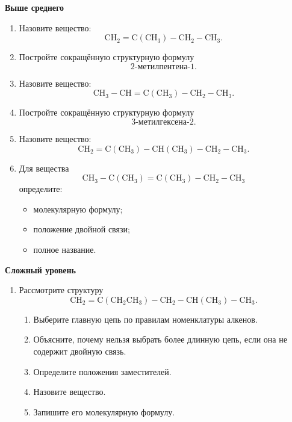 \documentclass[a4paper,12pt]{article}
\newcommand{\sublesson}[1]{%
    \vspace{0.4em}
    {\large\bfseries\color{accent}#1}\par
}
\begin{document}
\sublesson{Выше среднего}

\begin{enumerate}[label=\textbf{\arabic*.},resume]

\item Назовите вещество:
\[
\mathrm{CH_2=C(CH_3)-CH_2-CH_3}.
\]

\item Постройте сокращённую структурную формулу
\[
\text{2-метилпентена-1}.
\]

\item Назовите вещество:
\[
\mathrm{CH_3-CH=C(CH_3)-CH_2-CH_3}.
\]

\item Постройте сокращённую структурную формулу
\[
\text{3-метилгексена-2}.
\]

\item Назовите вещество:
\[
\mathrm{CH_2=C(CH_3)-CH(CH_3)-CH_2-CH_3}.
\]

\item Для вещества
\[
\mathrm{CH_3-C(CH_3)=C(CH_3)-CH_2-CH_3}
\]
определите:
\begin{itemize}
    \item молекулярную формулу;
    \item положение двойной связи;
    \item полное название.
\end{itemize}

\end{enumerate}

\sublesson{Сложный уровень}

\begin{enumerate}[label=\textbf{\arabic*.},resume]

\item Рассмотрите структуру
\[
\mathrm{CH_2=C(CH_2CH_3)-CH_2-CH(CH_3)-CH_3}.
\]

\begin{enumerate}[label=\alph*)]
    \item Выберите главную цепь по правилам номенклатуры алкенов.
    \item Объясните, почему нельзя выбрать более длинную цепь, если она не содержит двойную связь.
    \item Определите положения заместителей.
    \item Назовите вещество.
    \item Запишите его молекулярную формулу.
\end{enumerate}

\end{enumerate}
\end{document}
